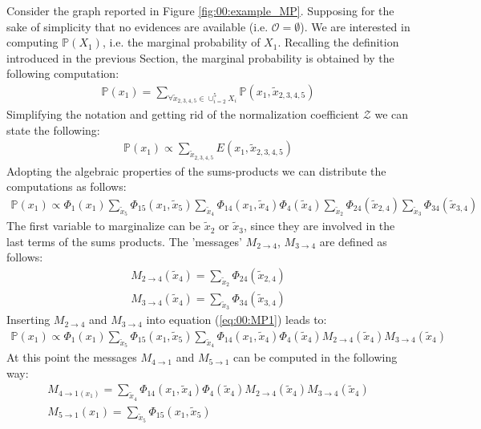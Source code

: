Consider the graph reported in Figure \ref{fig:00:example_MP}. Supposing for the sake of simplicity that no evidences are available (i.e. $\mathcal{O} = \emptyset$). We are interested in computing $\mathbb{P}(X_1)$, i.e. the marginal probability of $X_1$. Recalling the definition introduced in the previous Section, the marginal probability is obtained by the following computation:
\begin{eqnarray}
\mathbb{P}(x_1) = \sum _{\forall \tilde{x}_{2,3,4,5} \in \cup_{i=2}^5 X_i } \mathbb{P}(x_1, \tilde{x}_{2,3,4,5})
\end{eqnarray}
Simplifying the notation and getting rid of the normalization coefficient $\mathcal{Z}$ we can state the following:
\begin{eqnarray}
\mathbb{P}(x_1) \propto \sum _{\tilde{x}_{2,3,4,5} } E(x_1, \tilde{x}_{2,3,4,5})
\end{eqnarray}
Adopting the algebraic properties of the sums-products we can distribute the computations as follows:
\begin{eqnarray}
\mathbb{P}(x_1) \propto 
\Phi _{1}(x_1) 
\sum _{\tilde{x}_5} \Phi _{15}(x_1, \tilde{x}_5) 
\sum _{\tilde{x}_4} \Phi _{14}(x_1, \tilde{x}_4) \Phi _{4}(\tilde{x}_4)
\sum _{\tilde{x}_2} \Phi _{24}(\tilde{x}_{2,4}) 
\sum _{\tilde{x}_3} \Phi _{34}(\tilde{x}_{3,4})
\label{eq:00:MP1}
\end{eqnarray}
The first variable to marginalize can be $\tilde{x}_2$ or $\tilde{x}_3$, since they are involved in the last terms of the sums products. The 'messages' $M _{2 \rightarrow 4}$, $M _{3 \rightarrow 4}$ are  defined as follows:
\begin{eqnarray}
M _{2 \rightarrow 4}(\tilde{x}_4) = \sum _{\tilde{x}_2} \Phi _{24}(\tilde{x}_{2,4}) \nonumber\\
M _{3 \rightarrow 4}(\tilde{x}_4) = \sum _{\tilde{x}_3} \Phi _{34}(\tilde{x}_{3,4})
\end{eqnarray}
Inserting $M _{2 \rightarrow 4}$ and $M _{3 \rightarrow 4}$ into equation (\ref{eq:00:MP1}) leads to:
\begin{eqnarray}
\mathbb{P}(x_1) \propto 
\Phi _{1}(x_1) 
\sum _{\tilde{x}_5} \Phi _{15}(x_1, \tilde{x}_5) 
\sum _{\tilde{x}_4} \Phi _{14}(x_1, \tilde{x}_4) \Phi _{4}(\tilde{x}_4)
M _{2 \rightarrow 4}(\tilde{x}_4)
M _{3 \rightarrow 4}(\tilde{x}_4)
\label{eq:00:MP2}
\end{eqnarray}
At this point the messages $M _{4 \rightarrow 1}$ and $M _{5 \rightarrow 1}$ can be computed in the following way:
\begin{eqnarray}
M _{4 \rightarrow 1(x_1)} = \sum _{\tilde{x}_4} \Phi _{14}(x_1, \tilde{x}_4) \Phi _{4}(\tilde{x}_4)
M _{2 \rightarrow 4}(\tilde{x}_4)
M _{3 \rightarrow 4}(\tilde{x}_4) \nonumber\\
M _{5 \rightarrow 1}(x_1) =  \sum _{\tilde{x}_5} \Phi _{15}(x_1, \tilde{x}_5)
\end{eqnarray}
